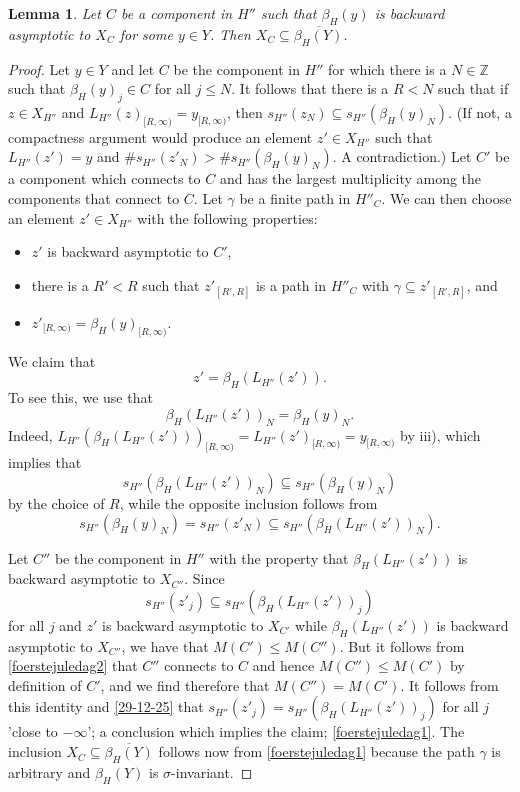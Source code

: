\documentclass[12pt,oneside,english]{amsart}
\newtheorem{lemma}[thm]{Lemma}
\begin{document}
\begin{lemma}\label{28-12-25d} Let $C$ be a component in $H''$ such that $\beta_H(y)$ is backward asymptotic to $X_C$ for some $y \in Y$. Then $X_C \subseteq \overline{\beta_H(Y)}$.
\end{lemma}
\begin{proof} Let $y \in Y$ and let $C$ be the component in $H''$ for which there is a $N \in \mathbb Z$ such that $\beta_H(y)_j \in C$ for all $j \leq N$. It follows that there is a $ R < N$ such that if $z \in X_{H''}$ and $L_{H''}(z)_{[R,\infty)} = y_{[R,\infty)}$, then $s_{H''}(z_N) \subseteq s_{H''}(\beta_H(y)_N)$. (If not, a compactness argument would produce an element $z' \in X_{H''}$ such that $L_{H''}(z') = y$ and $\# s_{H''}(z'_N) > \# s_{H''}(\beta_H(y)_N)$. A contradiction.) Let $C'$ be a component which connects to $C$ and has the largest multiplicity among the components that connect to $C$. Let $\gamma$ be a finite path in $H''_C$. We can then choose an element $z'  \in X_{H''}$ with the following properties:
\begin{itemize}
\item[i)] $z'$ is backward asymptotic to $C'$,
\item[ii)] there is a $R' < R$ such that $z'_{[R',R]}$ is a path in $H''_C$ with $\gamma \subseteq z'_{[R',R]}$, and
\item[iii)] $z'_{[R,\infty)} = \beta_H(y)_{[R,\infty)}$.
\end{itemize}
We claim that 
\begin{equation}\label{foerstejuledag1}
z' = \beta_H(L_{H''}(z')).
\end{equation}
To see this, we use that  
\begin{equation}\label{foerstejuledag2} 
\beta_H(L_{H''}(z'))_N =  \beta_H(y)_N.
 \end{equation}
Indeed, $L_{H''}(\beta_H(L_{H''}(z')))_{[R,\infty)} = L_{H''}(z')_{[R,\infty)}= y_{[R,\infty)}$ by iii), which implies that 
 $$
 s_{H''}(\beta_H(L_{H''}(z'))_N) \subseteq  s_{H''}(\beta_H(y)_N)
 $$ 
 by the choice of $R$, while the opposite inclusion follows from 
 $$
 s_{H''}(\beta_H(y)_N) = s_{H''}(z'_N) \subseteq s_{H''}(\beta_H(L_{H''}(z'))_N).
 $$ 


 Let $C''$ be the component in $H''$ with the property that $\beta_H(L_{H''}(z'))$ is backward asymptotic to $X_{C''}$. Since 
 \begin{equation}\label{29-12-25}
 s_{H''}(z'_j) \subseteq s_{H''}(\beta_H(L_{H''}(z'))_j)
 \end{equation} 
 for all $j$ and $z'$ is backward asymptotic to $X_{C'}$ while $\beta_H(L_{H''}(z'))$ is backward asymptotic to $X_{C''}$, we have that $M(C')  \leq M(C'')$. But it follows from \eqref{foerstejuledag2} that $C''$ connects to $C$ and hence $M(C'') \leq M(C')$ by definition of $C'$, and we find therefore that $M(C'') = M(C')$. It follows from this identity and \eqref{29-12-25} that $s_{H''}(z'_j) = s_{H''}(\beta_H(L_{H''}(z'))_j)$ for all $j$ 'close to $-\infty$'; a conclusion which implies the claim; \eqref{foerstejuledag1}. The inclusion $X_C \subseteq \overline{\beta_H(Y)}$ follows now from \eqref{foerstejuledag1} because the path $\gamma$ is arbitrary and $\beta_H(Y)$ is $\sigma$-invariant.
\end{proof}
\end{document}
